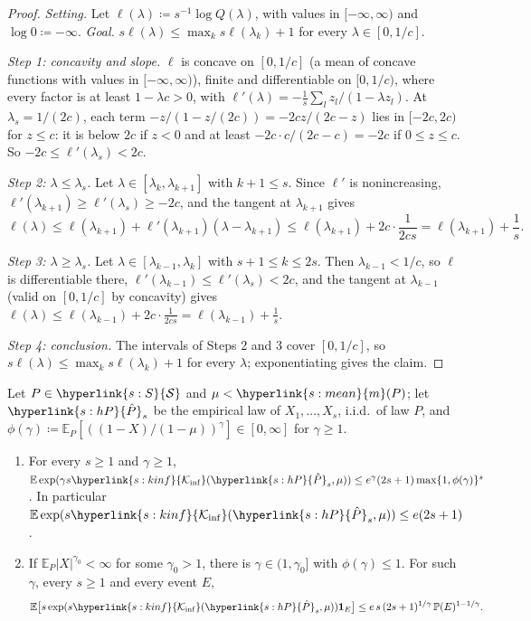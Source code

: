 \documentclass[11pt]{article}
\newcommand{\E}{\mathbb{E}}
\newcommand{\Prob}{\mathbb{P}}
\newcommand{\ind}{\mathbf{1}}
\newcommand{\sy}[2]{{\hyperlink{#1}{#2}}}
\newcommand{\Sm}{\sy{s:S}{\mathcal{S}}}
\newcommand{\mean}{\sy{s:mean}{m}}
\newcommand{\Kinf}{\sy{s:kinf}{\mathcal{K}_{\inf}}}
\newcommand{\hP}{\sy{s:hP}{\hat{P}}}
\begin{document}
\begin{proof}
\emph{Setting.} Let $\ell(\lambda)\coloneqq s^{-1}\log Q(\lambda)$, with values in
$[-\infty,\infty)$ and $\log0\coloneqq-\infty$. \emph{Goal.} $s\ell(\lambda)\le\max_ks\ell(\lambda_k)+1$ for every
$\lambda\in[0,1/c]$.

\emph{Step 1: concavity and slope.} $\ell$ is concave on $[0,1/c]$ (a mean of concave functions
with values in $[-\infty,\infty)$), finite and differentiable on $[0,1/c)$, where every factor is at least
$1-\lambda c>0$, with $\ell'(\lambda)=-\frac1s\sum_lz_l/(1-\lambda z_l)$. At $\lambda_s=1/(2c)$, each
term $-z/(1-z/(2c))=-2cz/(2c-z)$ lies in $[-2c,2c)$ for $z\le c$: it is below $2c$ if $z<0$ and at
least $-2c\cdot c/(2c-c)=-2c$ if $0\le z\le c$. So $-2c\le\ell'(\lambda_s)<2c$.

\emph{Step 2: $\lambda\le\lambda_s$.} Let $\lambda\in[\lambda_k,\lambda_{k+1}]$ with $k+1\le s$. Since
$\ell'$ is nonincreasing, $\ell'(\lambda_{k+1})\ge\ell'(\lambda_s)\ge-2c$, and the tangent at
$\lambda_{k+1}$ gives
\[
  \ell(\lambda)\le\ell(\lambda_{k+1})+\ell'(\lambda_{k+1})(\lambda-\lambda_{k+1})\le\ell(\lambda_{k+1})+2c\cdot\frac1{2cs}
  =\ell(\lambda_{k+1})+\frac1s.
\]

\emph{Step 3: $\lambda\ge\lambda_s$.} Let $\lambda\in[\lambda_{k-1},\lambda_k]$ with $s+1\le k\le2s$.
Then $\lambda_{k-1}<1/c$, so $\ell$ is differentiable there, $\ell'(\lambda_{k-1})\le\ell'(\lambda_s)<2c$,
and the tangent at $\lambda_{k-1}$ (valid on $[0,1/c]$ by concavity) gives
$\ell(\lambda)\le\ell(\lambda_{k-1})+2c\cdot\frac1{2cs}=\ell(\lambda_{k-1})+\frac1s$.

\emph{Step 4: conclusion.} The intervals of Steps 2 and 3 cover $[0,1/c]$, so
$s\ell(\lambda)\le\max_ks\ell(\lambda_k)+1$ for every $\lambda$; exponentiating gives the claim.
\end{proof}

\begin{lemma}\label{lem:moments}
Let $P\in\Sm$ and $\mu<\mean(P)$; let $\hP_s$ be the empirical law of $X_1,\dots,X_s$, i.i.d.\ of law $P$,
and $\phi(\gamma)\coloneqq\E_P[((1-X)/(1-\mu))^\gamma]\in[0,\infty]$ for $\gamma\ge1$.
\begin{enumerate}[label=(\alph*)]
\item For every $s\ge1$ and $\gamma\ge1$,
  $\E\exp(\gamma s\Kinf(\hP_s,\mu))\le e^\gamma(2s+1)\max\{1,\phi(\gamma)\}^s$. In particular
  $\E\exp(s\Kinf(\hP_s,\mu))\le e(2s+1)$.
\item If $\E_P|X|^{\gamma_0}<\infty$ for some $\gamma_0>1$, there is $\gamma\in(1,\gamma_0]$ with
  $\phi(\gamma)\le1$. For such $\gamma$, every $s\ge1$ and every event $E$,
  \[
    \E\big[s\exp(s\Kinf(\hP_s,\mu))\ind_E\big]\le e\,s\,(2s+1)^{1/\gamma}\,\Prob(E)^{1-1/\gamma}.
  \]
\end{enumerate}
\end{lemma}
\end{document}
